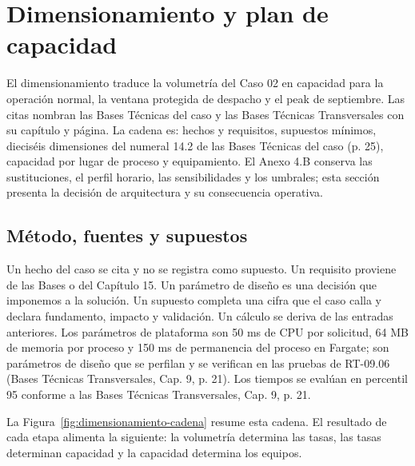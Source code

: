 %


\section{Dimensionamiento y plan de capacidad}
\label{sec:dimensionamiento}

El dimensionamiento traduce la volumetría del Caso 02 en capacidad para la operación normal, la ventana protegida de despacho y el peak de septiembre. Las citas nombran las Bases Técnicas del caso y las Bases Técnicas Transversales con su capítulo y página. La cadena es: hechos y requisitos, supuestos mínimos, dieciséis dimensiones del numeral 14.2 de las Bases Técnicas del caso (p. 25), capacidad por lugar de proceso y equipamiento. El Anexo 4.B conserva las sustituciones, el perfil horario, las sensibilidades y los umbrales; esta sección presenta la decisión de arquitectura y su consecuencia operativa.

\subsection{Método, fuentes y supuestos}
\label{sec:dimensionamiento-metodo}

Un hecho del caso se cita y no se registra como supuesto. Un requisito proviene de las Bases o del Capítulo 15. Un parámetro de diseño es una decisión que imponemos a la solución. Un supuesto completa una cifra que el caso calla y declara fundamento, impacto y validación. Un cálculo se deriva de las entradas anteriores. Los parámetros de plataforma son 50 ms de CPU por solicitud, 64 MB de memoria por proceso y 150 ms de permanencia del proceso en Fargate; son parámetros de diseño que se perfilan y se verifican en las pruebas de RT-09.06 (Bases Técnicas Transversales, Cap. 9, p. 21). Los tiempos se evalúan en percentil 95 conforme a las Bases Técnicas Transversales, Cap. 9, p. 21.

La Figura~\ref{fig:dimensionamiento-cadena} resume esta cadena. El resultado de cada etapa alimenta la siguiente: la volumetría determina las tasas, las tasas determinan capacidad y la capacidad determina los equipos.


